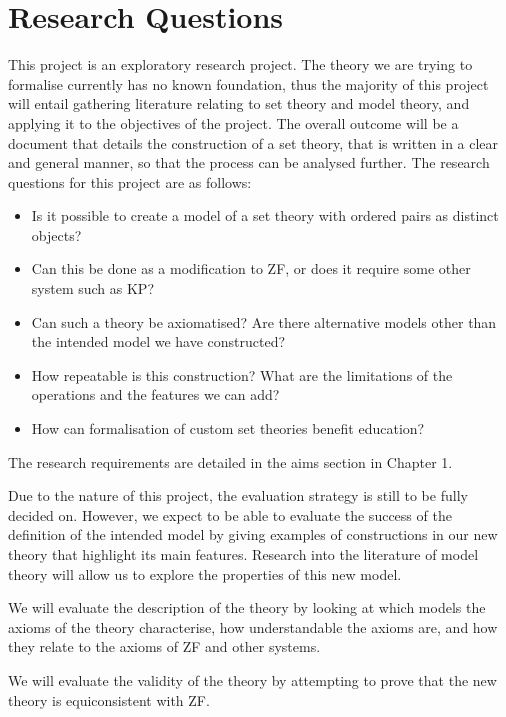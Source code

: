 \documentclass[11pt]{report}
\theoremstyle{definition}
\theoremstyle{theorem}
\theoremstyle{lemma}
\begin{document}
\section{Research Questions}
This project is an exploratory research project.
The theory we are trying to formalise currently has no known foundation, thus the majority of this project will entail gathering literature relating to set theory and model theory, and applying it to the objectives of the project.
The overall outcome will be a document that details the construction of a set theory, that is written in a clear and general manner, so that the process can be analysed further.
The research questions for this project are as follows:
\begin{itemize}
  \item Is it possible to create a model of a set theory with ordered pairs as distinct objects?
  \item Can this be done as a modification to ZF, or does it require some other system such as KP?
  \item Can such a theory be axiomatised? Are there alternative models other than the intended model we have constructed?
  \item How repeatable is this construction? What are the limitations of the operations and the features we can add?
  \item How can formalisation of custom set theories benefit education?
\end{itemize}
The research requirements are detailed in the aims section in Chapter 1.

Due to the nature of this project, the evaluation strategy is still to be fully decided on.
However, we expect to be able to evaluate the success of the definition of the intended model by giving examples of constructions in our new theory that highlight its main features. Research into the literature of model theory will allow us to explore the properties of this new model.

We will evaluate the description of the theory by looking at which models the axioms of the theory characterise, how understandable the axioms are, and how they relate to the axioms of ZF and other systems.

We will evaluate the validity of the theory by attempting to prove that the new theory is equiconsistent with ZF.
\end{document}
